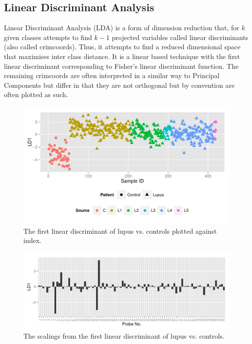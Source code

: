 \documentclass[a4paper, 12pt]{report}
\begin{document}
\subsection*{Linear Discriminant Analysis}
Linear Discriminant Analysis (\gls{LDA}) is a form of dimension reduction that, for $k$ given classes attempts to find $k-1$ projected variables called linear discriminants (also called crimcoords). Thus, it attempts to find a reduced dimensional space that maximises inter class distance. It is a linear based technique with the first linear discriminant corresponding to Fisher's linear discriminant function. The remaining crimcoords are often interpreted in a similar way to Principal Components but differ in that they are not orthogonal but by convention are often plotted as such. 

\begin{figure}[H]
\begin{centering}
\includegraphics[width=\textwidth]{lda} 
\caption{The first linear discriminant of lupus vs. controls plotted against index.} 
 \label{F:LDA}
\end{centering}
\end{figure}

\begin{figure}[H]
\begin{centering}
\includegraphics[width=\textwidth]{ldaScalings} 
\caption{The scalings from the first linear discriminant of lupus vs. controls.} 
 \label{F:LDAScalings}
\end{centering}
\end{figure}
\end{document}
